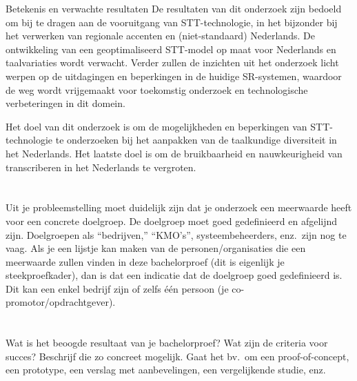 Betekenis en verwachte resultaten
De resultaten van dit onderzoek zijn bedoeld om bij te dragen aan de vooruitgang van STT-technologie, in het bijzonder bij het verwerken van regionale accenten en (niet-standaard) Nederlands. De ontwikkeling van een geoptimaliseerd STT-model op maat voor Nederlands en taalvariaties wordt verwacht. Verder zullen de inzichten uit het onderzoek licht werpen op de uitdagingen en beperkingen in de huidige SR-systemen, waardoor de weg wordt vrijgemaakt voor toekomstig onderzoek en technologische verbeteringen in dit domein.

Het doel van dit onderzoek is om de mogelijkheden en beperkingen van STT-technologie te onderzoeken bij het aanpakken van de taalkundige diversiteit in het Nederlands. Het laatste doel is om de bruikbaarheid en nauwkeurigheid van transcriberen in het Nederlands te vergroten.





\section{}%
\label{sec:probleemstelling}

Uit je probleemstelling moet duidelijk zijn dat je onderzoek een meerwaarde heeft voor een concrete doelgroep. De doelgroep moet goed gedefinieerd en afgelijnd zijn. Doelgroepen als ``bedrijven,'' ``KMO's'', systeembeheerders, enz.~zijn nog te vaag. Als je een lijstje kan maken van de personen/organisaties die een meerwaarde zullen vinden in deze bachelorproef (dit is eigenlijk je steekproefkader), dan is dat een indicatie dat de doelgroep goed gedefinieerd is. Dit kan een enkel bedrijf zijn of zelfs één persoon (je co-promotor/opdrachtgever).



\section{}%
\label{sec:onderzoeksdoelstelling}
Wat is het beoogde resultaat van je bachelorproef? Wat zijn de criteria voor succes? Beschrijf die zo concreet mogelijk. Gaat het bv.\ om een proof-of-concept, een prototype, een verslag met aanbevelingen, een vergelijkende studie, enz.

\section{}%
\label{sec:opzet-bachelorproef}

